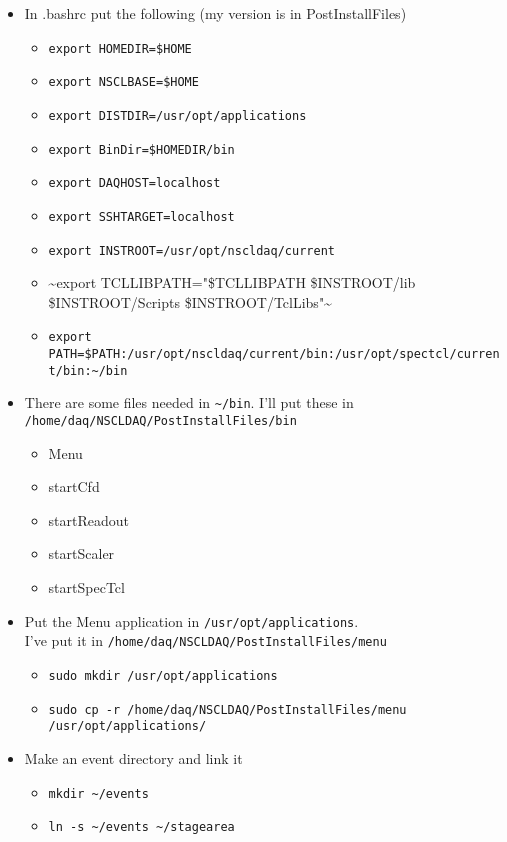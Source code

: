 \documentclass[11pt]{article}
\begin{document}
\begin{itemize}
\item In .bashrc put the following (my version is in PostInstallFiles)
\begin{itemize}
\item \verb~export HOMEDIR=$HOME~
\item \verb~export NSCLBASE=$HOME~
\item \verb~export DISTDIR=/usr/opt/applications~
\item \verb~export BinDir=$HOMEDIR/bin~
\item \verb~export DAQHOST=localhost~
\item \verb~export SSHTARGET=localhost~
\item \verb~export INSTROOT=/usr/opt/nscldaq/current~
\item \textasciitilde{}export TCLLIBPATH="\$TCLLIBPATH \$INSTROOT/lib \$INSTROOT/Scripts \$INSTROOT/TclLibs"\textasciitilde{}
\item \verb,export PATH=$PATH:/usr/opt/nscldaq/current/bin:/usr/opt/spectcl/current/bin:~/bin,
\end{itemize}
\item There are some files needed in \verb,~/bin,. I'll put these in \verb~/home/daq/NSCLDAQ/PostInstallFiles/bin~
\begin{itemize}
\item Menu
\item startCfd
\item startReadout
\item startScaler
\item startSpecTcl
\end{itemize}
\item Put the Menu application in \verb~/usr/opt/applications~.\\
    I've put it in \verb~/home/daq/NSCLDAQ/PostInstallFiles/menu~
\begin{itemize}
\item \verb~sudo mkdir /usr/opt/applications~
\item \verb~sudo cp -r /home/daq/NSCLDAQ/PostInstallFiles/menu /usr/opt/applications/~
\end{itemize}
\item Make an event directory and link it
\begin{itemize}
\item \verb,mkdir ~/events,
\item \verb,ln -s ~/events ~/stagearea,
\end{itemize}
\end{itemize}
\end{document}
